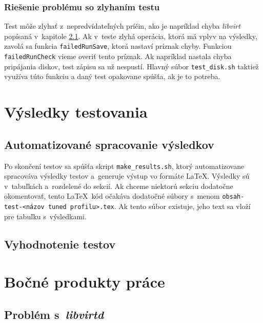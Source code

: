 \subsection{Riešenie problému so zlyhaním testu}
\label{sec:test-failure}

Test môže zlyhať z~nepredvídateľných príčin, ako je napríklad chyba
\emph{libvirt} popísaná v~kapitole \ref{sec:libvirt-problem}. Ak v~teste zlyhá
operácia, ktorá má vplyv na výsledky, zavolá sa funkcia \texttt{failedRunSave},
ktorá nastaví príznak chyby. Funkciou \texttt{failedRunCheck} vieme overiť
tento príznak. Ak napríklad nastala chyba pripájania diskov, test zápisu sa už
nespustí. Hlavný súbor \texttt{test\_disk.sh} taktiež využíva túto funkciu a
daný test opakovane spúšťa, ak je to potreba.

%
%

\chapter{Výsledky testovania}

\section{Automatizované spracovanie výsledkov}

Po skončení testov sa spúšťa skript \texttt{make\_results.sh}, ktorý
automatizovane spracováva výsledky testov a~generuje výstup vo formáte \LaTeX.
Výsledky sú v~tabuľkách a~rozdelené do sekcií. Ak chceme niektorú sekciu
dodatočne okomentovať, tento \LaTeX~kód očakáva dodatočné súbory s~menom
\texttt{obsah-test-<názov tuned profilu>.tex}. Ak tento súbor existuje, jeho
text sa vloží pre tabuľku s~výsledkami.


%
%

\section{Vyhodnotenie testov}


%
%

\chapter{Bočné produkty práce}

%
%

\section{Problém s~\emph{libvirtd}}
\label{sec:libvirt-problem}

